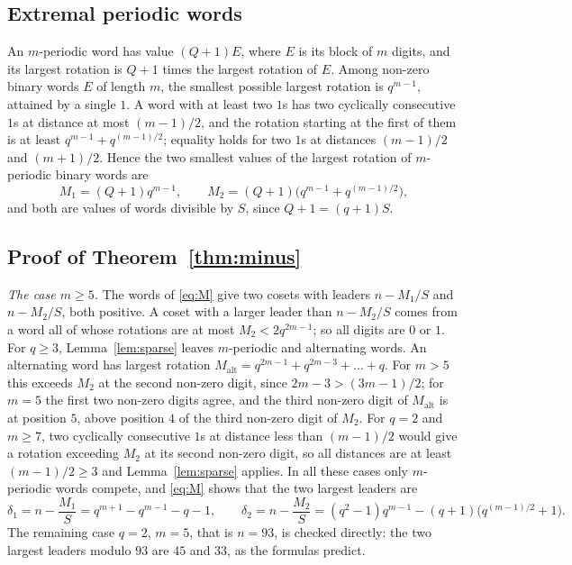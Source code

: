 \documentclass[11pt]{amsart}
\theoremstyle{remark}
\begin{document}
\subsection{Extremal periodic words}

An $m$-periodic word has value $(Q+1)E$, where $E$ is its block of $m$ digits, and its largest rotation is $Q+1$ times the largest rotation of $E$.
Among non-zero binary words $E$ of length $m$, the smallest possible largest rotation is $q^{m-1}$, attained by a single $1$.
A word with at least two $1$s has two cyclically consecutive $1$s at distance at most $(m-1)/2$, and the rotation starting at the first of them is at least $q^{m-1}+q^{(m-1)/2}$; equality holds for two $1$s at distances $(m-1)/2$ and $(m+1)/2$.
Hence the two smallest values of the largest rotation of $m$-periodic binary words are
\begin{equation}\label{eq:M}
M_1=(Q+1)q^{m-1},\qquad M_2=(Q+1)\bigl(q^{m-1}+q^{(m-1)/2}\bigr),
\end{equation}
and both are values of words divisible by $S$, since $Q+1=(q+1)S$.

\subsection{Proof of Theorem~\ref{thm:minus}}

\emph{The case $m\ge5$.}
The words of \eqref{eq:M} give two cosets with leaders $n-M_1/S$ and $n-M_2/S$, both positive.
A coset with a larger leader than $n-M_2/S$ comes from a word all of whose rotations are at most $M_2<2q^{2m-1}$; so all digits are $0$ or $1$.
For $q\ge3$, Lemma~\ref{lem:sparse} leaves $m$-periodic and alternating words.
An alternating word has largest rotation $M_{\mathrm{alt}}=q^{2m-1}+q^{2m-3}+\dots+q$.
For $m>5$ this exceeds $M_2$ at the second non-zero digit, since $2m-3>(3m-1)/2$; for $m=5$ the first two non-zero digits agree, and the third non-zero digit of $M_{\mathrm{alt}}$ is at position $5$, above position $4$ of the third non-zero digit of $M_2$.
For $q=2$ and $m\ge7$, two cyclically consecutive $1$s at distance less than $(m-1)/2$ would give a rotation exceeding $M_2$ at its second non-zero digit, so all distances are at least $(m-1)/2\ge3$ and Lemma~\ref{lem:sparse} applies.
In all these cases only $m$-periodic words compete, and \eqref{eq:M} shows that the two largest leaders are
\[
\delta_1=n-\frac{M_1}S=q^{m+1}-q^{m-1}-q-1,\qquad \delta_2=n-\frac{M_2}S=(q^2-1)q^{m-1}-(q+1)\bigl(q^{(m-1)/2}+1\bigr).
\]
The remaining case $q=2$, $m=5$, that is $n=93$, is checked directly: the two largest leaders modulo $93$ are $45$ and $33$, as the formulas predict.
\end{document}
